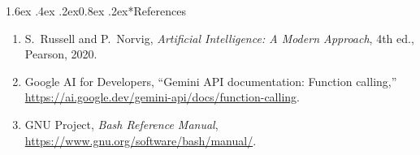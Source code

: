 \documentclass[11pt,a4paper]{article}
\makeatletter
\renewcommand\section{\@startsection{section}{1}{\z@}%
  {1.6ex \@plus .4ex \@minus .2ex}{0.8ex \@plus .2ex}{\normalfont\large\bfseries}}
\newcommand{\tightlist}{\setlength{\itemsep}{0pt}\setlength{\parsep}{0pt}\setlength{\topsep}{2pt}\setlength{\parskip}{0pt}}
\makeatother
\begin{document}
\section*{References}
\begingroup\small
\begin{enumerate}\tightlist
  \item S.~Russell and P.~Norvig, \emph{Artificial Intelligence: A Modern Approach}, 4th ed., Pearson, 2020.
  \item Google AI for Developers, ``Gemini API documentation: Function calling,''
    \href{https://ai.google.dev/gemini-api/docs/function-calling}{https://ai.google.dev/gemini-api/docs/function-calling}.
  \item GNU Project, \emph{Bash Reference Manual},
    \href{https://www.gnu.org/software/bash/manual/}{https://www.gnu.org/software/bash/manual/}.
\end{enumerate}
\endgroup
\end{document}
